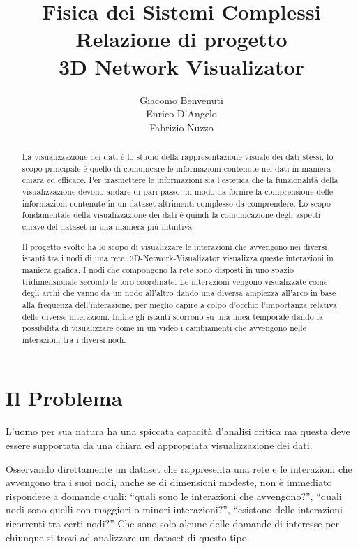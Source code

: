 \documentclass[a4paper,12pt]{article}
\title{Fisica dei Sistemi Complessi\\Relazione di progetto\\3D Network Visualizator}
\author{Giacomo Benvenuti\\Enrico D'Angelo\\Fabrizio Nuzzo}
\date{}
\begin{document}
\maketitle

\begin{abstract}
La visualizzazione dei dati \`e lo studio della rappresentazione visuale dei dati stessi, lo scopo principale \`e quello di comunicare le informazioni contenute nei dati in maniera chiara ed efficace. Per trasmettere le informazioni sia l'estetica che la funzionalità della visualizzazione devono andare di pari passo, in modo da fornire la comprensione delle informazioni contenute in un dataset altrimenti complesso da comprendere. Lo scopo fondamentale della visualizzazione dei dati \`e quindi la comunicazione degli aspetti chiave del dataset in una maniera più intuitiva.

Il progetto svolto ha lo scopo di visualizzare le interazioni che avvengono nei diversi istanti tra i nodi di una rete. 3D-Network-Visualizator visualizza queste interazioni in maniera grafica. I nodi che compongono la rete sono disposti in uno spazio tridimensionale secondo le loro coordinate. Le interazioni vengono visualizzate come degli archi che vanno da un nodo all'altro dando una diversa ampiezza all'arco in base alla frequenza dell'interazione, per meglio capire a colpo d'occhio l'importanza relativa delle diverse interazioni. Infine gli istanti scorrono su una linea temporale dando la possibilità di visualizzare come in un video i cambiamenti che avvengono nelle interazioni tra i diversi nodi.
\end{abstract}

\section{Il Problema}
L'uomo per sua natura ha una spiccata capacit\`a d'analisi critica ma questa deve essere supportata da una chiara ed appropriata visualizzazione dei dati.

Osservando direttamente un dataset che rappresenta una rete e le interazioni che avvengono tra i suoi nodi, anche se di dimensioni modeste, non \`e immediato rispondere a domande quali: “quali sono le interazioni che avvengono?”, “quali nodi sono quelli con maggiori o minori interazioni?”, “esistono delle interazioni ricorrenti tra certi nodi?” Che sono solo alcune delle domande di interesse per chiunque si trovi ad analizzare un dataset di questo tipo.
\end{document}
